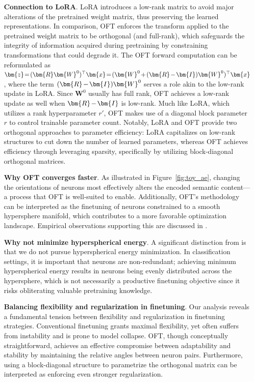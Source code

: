 \textbf{Connection to LoRA}. LoRA introduces a low-rank matrix to avoid major alterations of the pretrained weight matrix, thus preserving the learned representations. In comparison, OFT enforces the transform applied to the pretrained weight matrix to be orthogonal (and full-rank), which safeguards the integrity of information acquired during pretraining by constraining transformations that could degrade it. The OFT forward computation can be reformulated as $\thickmuskip=2mu \medmuskip=2mu \bm{z}=(\bm{R}\bm{W}^0)^\top\bm{x}=(\bm{W}^0+(\bm{R}-\bm{I})\bm{W}^0)^\top\bm{x}$, where the term $\thickmuskip=2mu \medmuskip=2mu (\bm{R}-\bm{I})\bm{W}^0$ serves a role akin to the low-rank update in LoRA. Since $\bm{W}^0$ usually has full rank, OFT achieves a low-rank update as well when $\thickmuskip=2mu \medmuskip=2mu \bm{R}-\bm{I}$ is low-rank. Much like LoRA, which utilizes a rank hyperparameter $r'$, OFT makes use of a diagonal block parameter $r$ to control trainable parameter count. Notably, LoRA and OFT provide two orthogonal approaches to parameter efficiency: LoRA capitalizes on low-rank structures to cut down the number of learned parameters, whereas OFT achieves efficiency through leveraging sparsity, specifically by utilizing block-diagonal orthogonal matrices.

\textbf{Why OFT converges faster}. As illustrated in Figure~\ref{fig:toy_ae}, changing the orientations of neurons most effectively alters the encoded semantic content—a process that OFT is well-suited to enable. Additionally, OFT's methodology can be interpreted as the finetuning of neurons constrained to a smooth hypersphere manifold, which contributes to a more favorable optimization landscape. Empirical observations supporting this are discussed in \cite{liu2021orthogonal}.

\textbf{Why not minimize hyperspherical energy}. A significant distinction from \cite{liu2021orthogonal} is that we do not pursue hyperspherical energy minimization. In classification settings, it is important that neurons are non-redundant; achieving minimum hyperspherical energy results in neurons being evenly distributed across the hypersphere, which is not necessarily a productive finetuning objective since it risks obliterating valuable pretraining knowledge.

\textbf{Balancing flexibility and regularization in finetuning}. Our analysis reveals a fundamental tension between flexibility and regularization in finetuning strategies. Conventional finetuning grants maximal flexibility, yet often suffers from instability and is prone to model collapse. OFT, though conceptually straightforward, achieves an effective compromise between adaptability and stability by maintaining the relative angles between neuron pairs. Furthermore, using a block-diagonal structure to parametrize the orthogonal matrix can be interpreted as enforcing even stronger regularization.

